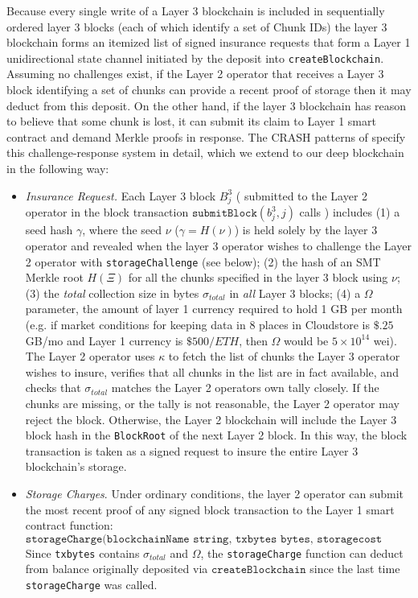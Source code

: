 \documentclass{article}
\newcommand{\block}[2]{B^{#1}_{#2}}
\newcommand{\blockhash}[2]{b^{#1}_{#2}}
\newcommand{\keyroot}{\kappa}
\newcommand{\hash}[1]{H(#1)}
\newcommand{\submitblock}[2]{\texttt{submitBlock}(#2, #1)}
\newcommand{\maxstoragecost}{\Omega}
\newcommand{\seedhash}{\gamma}
\newcommand{\seed}{\nu}
\begin{document}
Because every single write of a Layer 3 blockchain is included in sequentially ordered layer 3 blocks (each of which identify a set of Chunk IDs) the layer 3 blockchain forms an itemized list of signed insurance requests that form a Layer 1 unidirectional state channel initiated by the deposit into \texttt{createBlockchain}.  Assuming no challenges exist, if the Layer 2 operator that receives a Layer 3 block identifying a set of chunks can provide a recent proof of storage then it may deduct from this deposit.   On the other hand, if the layer 3 blockchain has reason to believe that some chunk is lost, it can submit its claim to Layer 1 smart contract and demand Merkle proofs in response.   The CRASH patterns of \cite{swarm} specify this challenge-response system in detail, which we extend to our deep blockchain in the following way:
\begin{itemize}
    \item  {\em Insurance Request.} Each Layer 3 block $\block{3}{j}$ ( submitted to the Layer 2 operator in the block transaction $\submitblock{j}{\blockhash{3}{j}}$ calls ) includes (1) a seed hash $\seedhash$, where the seed $\seed$ ($\seedhash=\hash{\seed}$) is held solely by the layer 3 operator and  revealed when the layer 3 operator wishes to challenge the Layer 2 operator with \texttt{storageChallenge} (see below); (2) the hash of an SMT Merkle root $H(\Xi)$ for all the chunks specified in the layer 3 block using $\seed$; (3)   the {\em total} collection size in bytes $\sigma_{total}$ in {\em all} Layer 3 blocks; (4) a $\maxstoragecost$ parameter, the amount of layer 1 currency required to hold 1 GB per month (e.g. if market conditions for keeping data in 8 places in Cloudstore is $\$.25$ GB/mo and Layer 1 currency is $\$500/ETH$, then $\maxstoragecost$ would be $5\times10^14$ wei).  The Layer 2 operator uses $\keyroot$ to fetch the list of chunks the Layer 3 operator wishes to insure, verifies that all chunks in the list are in fact available, and checks that $\sigma_{total}$ matches the  Layer 2 operators own tally closely.  If the chunks are missing, or the tally is not reasonable, the Layer 2 operator may reject the block.  Otherwise, the Layer 2 blockchain will include the Layer 3 block hash in the  \texttt{BlockRoot} of the next Layer 2 block.  In this way, the block transaction is taken as a signed request to insure the entire Layer 3 blockchain's storage.

    \item {\em Storage Charges}.   Under ordinary conditions, the layer 2 operator can submit the most recent proof of any signed block transaction to the Layer 1 smart contract function:
    \[
    \texttt{storageCharge(blockchainName string, txbytes bytes, storagecost uint64, sig bytes)}
    \]
    Since \texttt{txbytes}  contains $\sigma_{total}$ and $\maxstoragecost$, the \texttt{storageCharge} function can deduct from balance originally deposited via $\texttt{createBlockchain}$ since the last time \texttt{storageCharge} was called.


\end{itemize}
\end{document}
